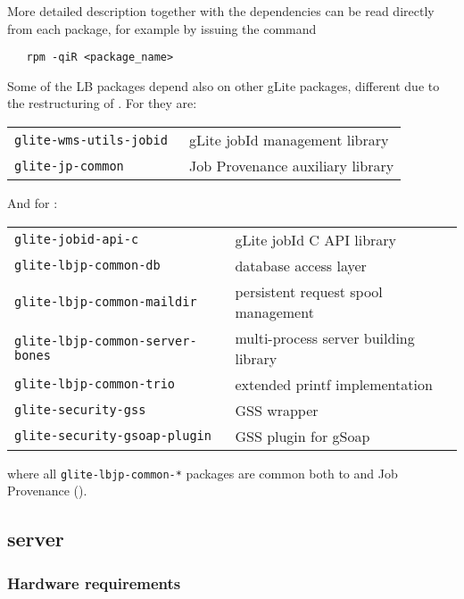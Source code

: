 More detailed description together with the dependencies can be read directly from each package,
for example by issuing the command 
\begin{verbatim}
   rpm -qiR <package_name>
\end{verbatim}

Some of the LB packages depend also on other gLite packages, different 
due to the restructuring of \LBnew.
For \LBold they are:


\begin{tabularx}{\textwidth}{>{\tt}lX}
glite-wms-utils-jobid & gLite jobId management library \\
glite-jp-common & Job Provenance auxiliary library \\ 
\end{tabularx}

\noindent
And for \LBnew:

\begin{tabularx}{\textwidth}{>{\tt}lX}
glite-jobid-api-c & gLite jobId C API library \\ 
glite-lbjp-common-db & database access layer \\
glite-lbjp-common-maildir & persistent request spool management \\
glite-lbjp-common-server-bones & multi-process server building library \\
glite-lbjp-common-trio & extended printf implementation \\
glite-security-gss & GSS wrapper \\
glite-security-gsoap-plugin & GSS plugin for gSoap \\
\end{tabularx}

where all \verb'glite-lbjp-common-*' packages are common both to \LB and 
Job Provenance (\JP).


\subsection{\LB server}

\subsubsection{Hardware requirements}
\label{inst:hw_req}


